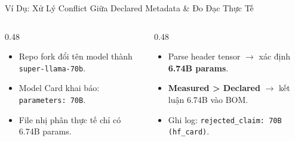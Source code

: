 \documentclass[aspectratio=169, xcolor=table]{beamer}
\begin{document}
\begin{frame}{Ví Dụ: Xử Lý Conflict Giữa Declared Metadata \& Đo Đạc Thực Tế}
    \begin{columns}[onlytextwidth, T]
        \begin{column}{0.48\textwidth}
            \begin{alertbox}
                \scriptsize
                \begin{itemize}
                    \item Repo fork đổi tên model thành \texttt{super-llama-70b}.
                    \item Model Card khai báo: \texttt{parameters: 70B}.
                    \item File nhị phân thực tế chỉ có 6.74B params.
                \end{itemize}
            \end{alertbox}
        \end{column}
        \hfill
        \begin{column}{0.48\textwidth}
            \begin{successbox}
                \scriptsize
                \begin{itemize}
                    \item Parse header tensor $\to$ xác định \textbf{6.74B params}.
                    \item \textbf{Measured > Declared} $\to$ kết luận 6.74B vào BOM.
                    \item Ghi log: \texttt{rejected\_claim: 70B (hf\_card)}.
                \end{itemize}
            \end{successbox}
        \end{column}
    \end{columns}
\end{frame}
\end{document}
